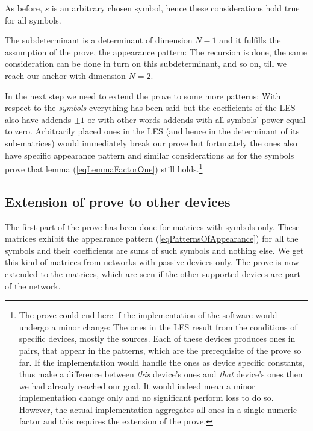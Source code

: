 As before, $s$ is an arbitrary chosen symbol, hence these considerations
hold true for all symbols.

The subdeterminant is a determinant of dimension $N-1$ and it fulfills the
assumption of the prove, the appearance pattern: The recursion is done,
the same consideration can be done in turn on this subdeterminant, and so
on, till we reach our anchor with dimension $N=2$.

In the next step we need to extend the prove to some more patterns: With
respect to the \emph{symbols} everything has been said but the
coefficients of the LES also have addends $\pm 1$ or with other words
addends with all symbols' power equal to zero. Arbitrarily placed ones in
the LES (and hence in the determinant of its sub-matrices) would
immediately break our prove but fortunately the ones also have specific
appearance pattern and similar considerations as for the symbols prove
that lemma (\ref{eqLemmaFactorOne}) still holds.\footnote{The prove could
end here if the implementation of the software would undergo a minor
change: The ones in the LES result from the conditions of specific
devices, mostly the sources. Each of these devices produces ones in pairs,
that appear in the patterns, which are the prerequisite of the prove so
far. If the implementation would handle the ones as device specific
constants, thus make a difference between \emph{this} device's ones and
\emph{that} device's ones then we had already reached our goal. It would
indeed mean a minor implementation change only and no significant perform
loss to do so. However, the actual implementation aggregates all ones in a
single numeric factor and this requires the extension of the prove.}


\subsection{Extension of prove to other devices}

The first part of the prove has been done for matrices with symbols only.
These matrices exhibit the appearance pattern
(\ref{eqPatternsOfAppearance}) for all the symbols and their coefficients
are sums of such symbols and nothing else. We get this kind of matrices
from networks with passive devices only. The prove is now extended to the
matrices, which are seen if the other supported devices are part of the
network.

